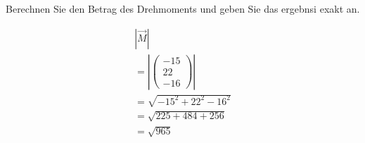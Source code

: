 Berechnen Sie den Betrag des Drehmoments und geben Sie das ergebnsi exakt an.

\begin{align*}
    \left|\vec{M}\right|         \\
    = \left|\begin{pmatrix}
                -15 \\ 22 \\ -16
            \end{pmatrix}\right| \\
    = \sqrt{-15^2 + 22^2 -16^2}  \\
    = \sqrt{225 + 484 + 256}     \\
    = \sqrt{965}
\end{align*}
